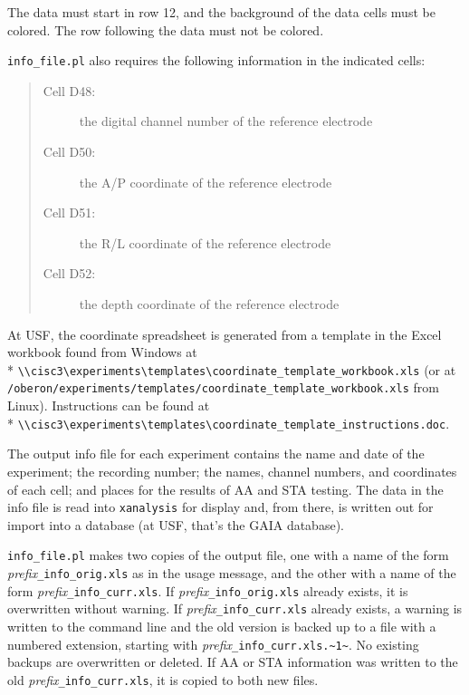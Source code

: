\documentclass{article}
\begin{document}
The data must start in row 12, and the background of the data cells
must be colored.  The row following the data must not be colored.

{\tt info\_file.pl} also requires the following information in the
indicated cells:
\begin{quote}
\begin{description}
\item[Cell D48:] the digital channel number of the reference electrode
\item[Cell D50:] the A/P coordinate of the reference electrode
\item[Cell D51:] the R/L coordinate of the reference electrode
\item[Cell D52:] the depth coordinate of the reference electrode
\end{description}
\end{quote}

At USF, the coordinate spreadsheet is generated from a template in the
Excel workbook found from Windows at\\*
\verb#\\cisc3\experiments\templates\coordinate_template_workbook.xls#
(or at
\verb#/oberon/experiments/templates/coordinate_template_workbook.xls#
from Linux).  Instructions can be found at\\*
\verb#\\cisc3\experiments\templates\coordinate_template_instructions.doc#.

The output info file for each experiment contains the name and date of
the experiment; the recording number; the names, channel numbers, and
coordinates of each cell; and places for the results of AA and STA
testing.  The data in the info file is read into {\tt xanalysis} for
display and, from there, is written out for import into a database (at
USF, that's the GAIA database).

{\tt info\_file.pl} makes two copies of the output file, one with a
name of the form \emph{prefix}\verb#_info_orig.xls# as in the usage
message, and the other with a name of the form
\emph{prefix}\verb#_info_curr.xls#.  If
\emph{prefix}\verb#_info_orig.xls# already exists, it is overwritten
without warning.  If \emph{prefix}\verb#_info_curr.xls# already
exists, a warning is written to the command line and the old version
is backed up to a file with a numbered extension, starting with
\emph{prefix}\verb#_info_curr.xls.~1~#.  No existing backups are
overwritten or deleted.  If AA or STA information was written to the
old \emph{prefix}\verb#_info_curr.xls#, it is copied to both new
files.
\end{document}
